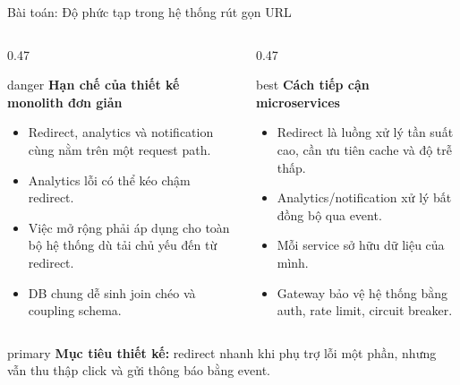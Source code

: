 \documentclass[aspectratio=169]{beamer}
\begin{document}
\begin{frame}{Bài toán: Độ phức tạp trong hệ thống rút gọn URL}
    \begin{columns}[T,onlytextwidth]
        \begin{column}{0.47\textwidth}
            \begin{claimbox}{danger}
                \textbf{Hạn chế của thiết kế monolith đơn giản}
                \begin{itemize}\tiny
                    \item Redirect, analytics và notification cùng nằm trên một request path.
                    \item Analytics lỗi có thể kéo chậm redirect.
                    \item Việc mở rộng phải áp dụng cho toàn bộ hệ thống dù tải chủ yếu đến từ redirect.
                    \item DB chung dễ sinh join chéo và coupling schema.
                \end{itemize}
            \end{claimbox}
        \end{column}
        \begin{column}{0.47\textwidth}
            \begin{claimbox}{best}
                \textbf{Cách tiếp cận microservices}
                \begin{itemize}\scriptsize
                    \item Redirect là luồng xử lý tần suất cao, cần ưu tiên cache và độ trễ thấp.
                    \item Analytics/notification xử lý bất đồng bộ qua event.
                    \item Mỗi service sở hữu dữ liệu của mình.
                    \item Gateway bảo vệ hệ thống bằng auth, rate limit, circuit breaker.
                \end{itemize}
            \end{claimbox}
        \end{column}
    \end{columns}
    \vspace{0.25cm}
    \begin{center}
        \begin{claimbox}[width=0.86\textwidth, halign=center]{primary}
            \textbf{Mục tiêu thiết kế:} redirect nhanh khi phụ trợ lỗi một phần, nhưng vẫn thu thập click và gửi thông báo bằng event.
        \end{claimbox}
    \end{center}
\end{frame}
\end{document}
